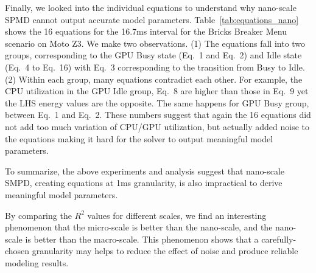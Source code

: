 Finally, we looked into the individual equations to understand why
nano-scale SPMD cannot output accurate model parameters. %
Table~\ref{tab:equations_nano} shows the 16 equations for the 16.7ms
interval for the Bricks Breaker Menu scenario on Moto Z3. We make two
observations.  (1) The equations fall into two groups, corresponding
to the GPU Busy state (\ie Eq.~1 and Eq.~2) and Idle state (\ie Eq.~4 to Eq.~16)
with Eq.~3 corresponding to the transition from Busy to Idle.
(2) Within each group, many equations contradict each other.
For example, the CPU utilization in the GPU Idle group, Eq.~8 are higher than
those in Eq.~9 yet the LHS energy values are the opposite. The same
happens for GPU Busy group, \eg between Eq.~1 and Eq.~2. These numbers
suggest that again the 16 equations  did not add {\color{blue}too much variation of CPU/GPU utilization}, but actually added noise to the equations making it hard
for the solver to output meaningful model parameters.

To summarize, the above experiments and analysis suggest that nano-scale SMPD, \ie
creating equations at 1ms granularity, is also impractical to derive
meaningful model parameters.

{\color{blue}By comparing the $R^2$ values for different scales, we find an interesting phenomenon that the micro-scale is better than the nano-scale, and the nano-scale is better than the macro-scale. This phenomenon shows that a carefully-chosen granularity may helps to reduce the effect of noise and produce reliable modeling results.}

